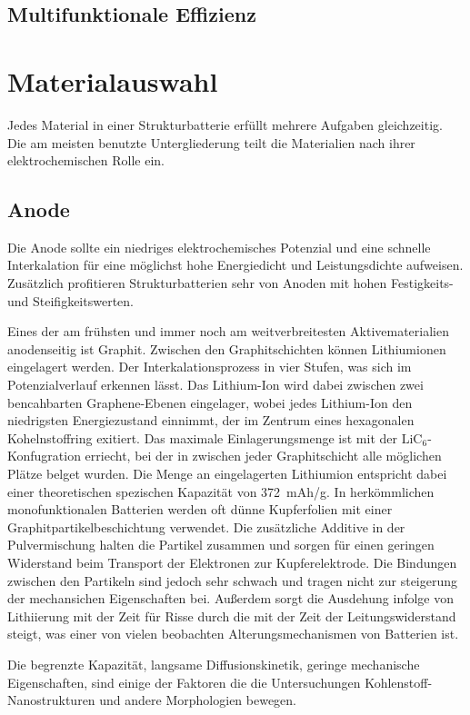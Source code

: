 \subsection{Multifunktionale Effizienz}

\section{Materialauswahl}

Jedes  Material in einer Strukturbatterie erfüllt mehrere Aufgaben gleichzeitig. Die am meisten benutzte Untergliederung teilt die Materialien nach ihrer elektrochemischen Rolle ein.


\subsection{Anode}
Die Anode sollte ein niedriges elektrochemisches Potenzial und eine schnelle Interkalation für eine möglichst hohe Energiedicht und Leistungsdichte aufweisen. Zusätzlich profitieren Strukturbatterien sehr von Anoden mit hohen Festigkeits- und Steifigkeitswerten.

Eines der am frühsten und immer noch am weitverbreitesten Aktivematerialien anodenseitig ist Graphit. Zwischen den Graphitschichten können Lithiumionen eingelagert werden. Der Interkalationsprozess in vier Stufen, was sich im Potenzialverlauf erkennen lässt. Das Lithium-Ion wird dabei zwischen zwei bencahbarten Graphene-Ebenen eingelager, wobei jedes Lithium-Ion den niedrigsten Energiezustand einnimmt, der im Zentrum eines hexagonalen Kohelnstoffring exitiert. Das maximale Einlagerungsmenge ist mit der $\text{LiC}_\text{6}$-Konfugration erriecht, bei der in zwischen jeder Graphitschicht alle möglichen Plätze belget wurden. Die Menge an eingelagerten Lithiumion entspricht dabei  einer theoretischen spezischen Kapazität von 372~mAh/g. 
In herkömmlichen monofunktionalen Batterien werden oft dünne Kupferfolien mit einer Graphitpartikelbeschichtung verwendet. Die zusätzliche Additive in der Pulvermischung halten die Partikel zusammen und sorgen für einen geringen Widerstand beim Transport der Elektronen zur Kupferelektrode. Die Bindungen zwischen den Partikeln sind jedoch sehr schwach und tragen nicht zur steigerung der mechansichen Eigenschaften bei. Außerdem sorgt die Ausdehung infolge von Lithiierung mit der Zeit für Risse durch die mit der Zeit der Leitungswiderstand steigt, was einer von vielen beobachten Alterungsmechanismen von Batterien ist.

Die begrenzte Kapazität, langsame Diffusionskinetik, geringe mechanische Eigenschaften, sind einige der Faktoren die die Untersuchungen Kohlenstoff-Nanostrukturen und andere Morphologien bewegen.

